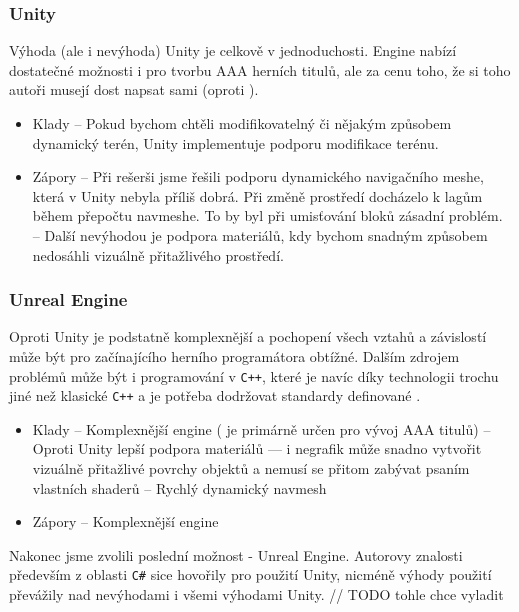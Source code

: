 \subsubsection{Unity}
Výhoda (ale i nevýhoda) Unity je celkově v jednoduchosti. Engine nabízí dostatečné možnosti i pro tvorbu AAA herních titulů, ale za cenu toho, že si toho autoři musejí dost napsat sami (oproti \UE{}). 
\begin{itemize}
	\item Klady
		\subitem -- Pokud bychom chtěli modifikovatelný či nějakým způsobem dynamický terén, Unity implementuje podporu modifikace terénu.
	\item Zápory
		\subitem -- Při rešerši jsme řešili podporu dynamického navigačního meshe, která v Unity nebyla příliš dobrá. Při změně prostředí docházelo k lagům během přepočtu navmeshe. To by byl při umisťování bloků zásadní problém.
		\subitem -- Další nevýhodou je podpora materiálů, kdy bychom snadným způsobem nedosáhli vizuálně přitažlivého prostředí.

\end{itemize}

\subsubsection{Unreal Engine}
Oproti Unity je \UE{} podstatně komplexnější a pochopení všech vztahů a závislostí může být pro začínajícího herního programátora obtížné. Dalším zdrojem problémů může být i programování v \texttt{C++}, které je navíc díky technologii \UBT{} trochu jiné než klasické \texttt{C++} a je potřeba dodržovat standardy definované \UE{}.
\begin{itemize}
	\item Klady
		\subitem -- Komplexnější engine (\UE{} je primárně určen pro vývoj AAA titulů)
		\subitem -- Oproti Unity lepší podpora materiálů --- i negrafik může snadno vytvořit vizuálně přitažlivé povrchy objektů a nemusí se přitom zabývat psaním vlastních shaderů 
		\subitem -- Rychlý dynamický navmesh
	\item Zápory
		\subitem -- Komplexnější engine

\end{itemize}

Nakonec jsme zvolili poslední možnost - Unreal Engine. Autorovy znalosti především z oblasti \texttt{C\#} sice hovořily pro použití Unity, nicméně výhody použití \UE{} převážily nad nevýhodami i všemi výhodami Unity.	// TODO tohle chce vyladit